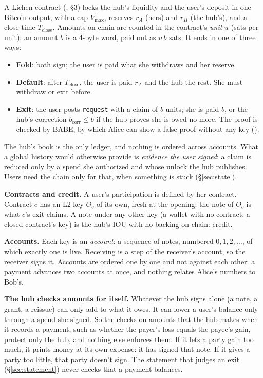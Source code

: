 \documentclass[11pt]{article}
\theoremstyle{plain}
\theoremstyle{definition}
\newcommand{\vmax}{V_{\max}}
\newcommand{\Tc}{T_{\mathrm{close}}}
\newcommand{\bcorr}{b_{\mathrm{corr}}}
\newcommand{\tx}[1]{\texttt{#1}}
\newcommand{\Oc}{O_c}
\begin{document}
A Lichen contract (\cite{lichen}, \S3) locks the hub's liquidity and the
user's deposit in one Bitcoin output, with a cap $\vmax$, reserves $r_A$
(hers) and $r_H$ (the hub's), and a close time $\Tc$. Amounts on chain
are counted in the contract's \emph{unit} $u$ (sats per unit): an amount
$b$ is a 4-byte word, paid out as $u\,b$ sats. It ends in one of three
ways:
\begin{itemize}[nosep]
\item \textbf{Fold}: both sign; the user is paid what she withdraws and
  her reserve.
\item \textbf{Default}: after $\Tc$, the user is paid $r_A$ and the hub
  the rest. She must withdraw or exit before.
\item \textbf{Exit}: the user posts \tx{request} with a claim of $b$
  units; she is paid $b$, or the hub's correction $\bcorr \le b$ if the
  hub proves she is owed no more. The proof is checked by BABE, by which
  Alice can show a false proof without any key (\cite{lichen}).
\end{itemize}

The hub's book is the only ledger, and nothing is ordered across
accounts. What a global history would otherwise provide is \emph{evidence
the user signed}: a claim is reduced only by a spend she authorized and
whose unlock the hub publishes. Users need the chain only for that,
when something is stuck (\S\ref{sec:state}).

\textbf{Contracts and credit.} A user's participation is defined by her
contract. Contract $c$ has an L2 key $\Oc$ of its own, fresh at the
opening; the note of $\Oc$ is what $c$'s exit claims. A note under any
other key (a wallet with no contract, a closed contract's key) is the
hub's IOU with no backing on chain: credit.

\textbf{Accounts.} Each key is an \emph{account}: a sequence of notes,
numbered $0, 1, 2, \dots$, of which exactly one is live. Receiving is a
step of the receiver's account, so the receiver signs it. Accounts are
ordered one by one and not against each other: a payment advances two
accounts at once, and nothing relates Alice's numbers to Bob's.

\textbf{The hub checks amounts for itself.} Whatever the hub signs alone
(a note, a grant, a reissue) can only add to what it owes. It can lower
a user's balance only through a spend she signed. So the checks on
amounts that the hub makes when it records a payment, such as whether
the payer's loss equals the payee's gain, protect only the hub, and
nothing else enforces them. If it lets a party gain too much, it prints
money at its own expense: it has signed that note. If it gives a party
too little, that party doesn't sign. The statement that judges an exit
(\S\ref{sec:statement}) never checks that a payment balances.
\end{document}
